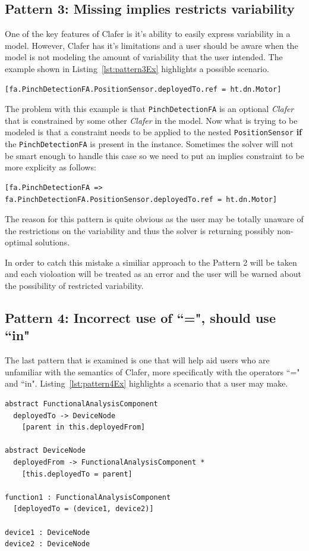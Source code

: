 \documentclass[10pt,oneside]{IEEEtran}
\begin{document}
\subsection{Pattern 3: Missing implies restricts variability}
One of the key features of Clafer is it's ability to easily express variability in a model. However, Clafer has it's limitations and a user should be aware when the model is not modeling the amount of variability that the user intended. The example shown in Listing~\ref{lst:pattern3Ex} highlights a possible scenario.
\begin{lstlisting}[label={lst:pattern3Ex},caption={Example of Pattern 3}]
[fa.PinchDetectionFA.PositionSensor.deployedTo.ref = ht.dn.Motor]
\end{lstlisting}

The problem with this example is that \lstinline$PinchDetectionFA$ is an optional \textit{Clafer} that is constrained by some other \textit{Clafer} in the model. Now what is trying to be modeled is that a constraint needs to be applied to the nested \lstinline$PositionSensor$ \textbf{if} the \lstinline$PinchDetectionFA$ is present in the instance. Sometimes the solver will not be smart enough to handle this case so we need to put an implies constraint to be more explicity as follows:
\begin{lstlisting}[]
[fa.PinchDetectionFA => fa.PinchDetectionFA.PositionSensor.deployedTo.ref = ht.dn.Motor]
\end{lstlisting}

The reason for this pattern is quite obvious as the user may be totally unaware of the restrictions on the variability and thus the solver is returning possibly non-optimal solutions.

In order to catch this mistake a similiar approach to the Pattern 2 will be taken and each violoation will be treated as an error and the user will be warned about the possibility of restricted variability.

\subsection{Pattern 4: Incorrect use of ``=", should use ``in"}
The last pattern that is examined is one that will help aid users who are unfamiliar with the semantics of Clafer, more specificatly with the operators ``=" and ``in". Listing~\ref{lst:pattern4Ex} highlights a scenario that a user may make.
\begin{lstlisting}[label={lst:pattern4Ex},caption={Example of Pattern 4},numbers=right]
abstract FunctionalAnalysisComponent
  deployedTo -> DeviceNode
    [parent in this.deployedFrom]

abstract DeviceNode
  deployedFrom -> FunctionalAnalysisComponent *
    [this.deployedTo = parent]

function1 : FunctionalAnalysisComponent
  [deployedTo = (device1, device2)]

device1 : DeviceNode
device2 : DeviceNode
\end{lstlisting}
\end{document}
